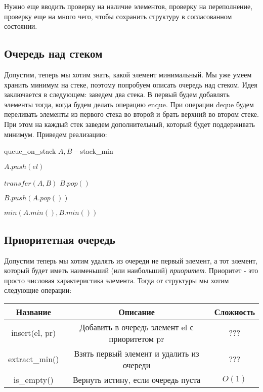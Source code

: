 \documentclass[../main.tex]{subfiles}
\begin{document}
	Нужно еще вводить проверку на наличие элементов, проверку на переполнение, проверку еще на много чего, чтобы сохранить структуру в согласованном состоянии.
	
	\subsection{Очередь над стеком}
	
	Допустим, теперь мы хотим знать, какой элемент минимальный. Мы уже умеем хранить минимум на стеке, поэтому попробуем описать очередь над стеком. Идея заключается в следующем: заведем два стека. В первый будем добавлять элементы тогда, когда будем делать операцию enque. При операции deque будем переливать элементы из первого стека во второй и брать верхний во втором стеке. При этом на каждый стек заведем дополнительный, который будет поддерживать минимум. Приведем реализацию:
	
	\begin{struct}{queue\_on\_stack}
		\State $A, B$ -- stack\_min
		
		\State
		
			\State $A.push(el)$
		\EndFunction
		
		\State 
		
				\State $transfer(A, B)$
			\EndIf
			\State \Return $B.pop()$
		\EndFunction
		
		\State
		
				\State $B.push(A.pop())$
			\EndWhile
		\EndFunction
		
		\State
		
			\State \Return $min(A.min(), B.min())$
		\EndFunction
	\end{struct}
	
	\subsection{Приоритетная очередь}
	
	Допустим теперь мы хотим удалять из очереди не первый элемент, а тот элемент, который будет иметь наименьший (или наибольший) \textit{приоритет}. Приоритет - это просто числовая характеристика элемента. Тогда от структуры мы хотим следующие операции:
	
	\begin{center}
		\begin{tabular}{c|c|c}
			Название & Описание & Сложность \\ \hline
			insert(el, pr) & Добавить в очередь элемент el с приоритетом pr& ??? \\ \hline
			extract\_min() & Взять первый элемент и удалить из очереди &  ??? \\ \hline
			is\_empty() & Вернуть истину, если очередь пуста & $ O(1) $	
		\end{tabular}
	\end{center}
	
\end{document}
